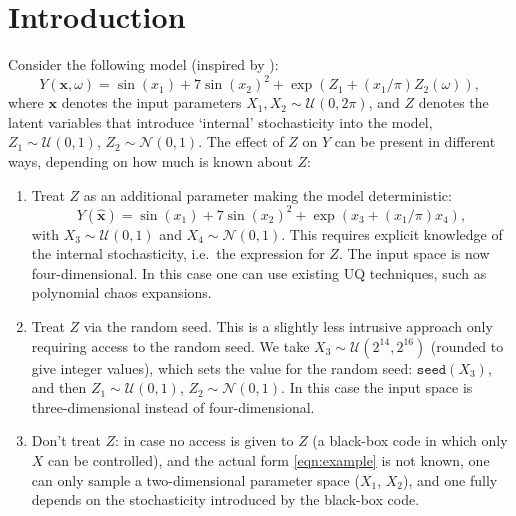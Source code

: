 \documentclass{elsarticle}
\newcommand{\vt}[1]{\bm{#1}}
\begin{document}
\section{Introduction}
Consider the following model (inspired by \cite{Zhu2020a}):
\begin{equation}\label{eqn:example}
Y(\vt{x},\omega) = \sin(x_{1}) + 7 \sin(x_{2})^2 + \exp( Z_{1} + (x_{1}/\pi) Z_{2}(\omega)),
\end{equation}
where $\vt{x}$ denotes the input parameters $X_{1},X_{2} \sim \mathcal{U}(0,2\pi)$, and $Z$ denotes the latent variables that introduce `internal' stochasticity into the model, $Z_{1} \sim \mathcal{U}(0,1)$, $Z_{2} \sim \mathcal{N}(0,1)$.
The effect of $Z$ on $Y$ can be present in different ways, depending on how much is known about $Z$:
\begin{enumerate}
\item Treat $Z$ as an additional parameter making the model deterministic:
\begin{equation}
Y(\hat{\vt{x}}) = \sin(x_{1}) + 7 \sin(x_{2})^2 + \exp( x_{3} + (x_{1}/\pi) x_{4}),
\end{equation}
with $X_{3}\sim \mathcal{U}(0,1)$ and $X_{4}\sim \mathcal{N}(0,1)$. This requires explicit knowledge of the internal stochasticity, i.e.\ the expression for $Z$. The input space is now four-dimensional. In this case one can use existing UQ techniques, such as polynomial chaos expansions.
\item Treat $Z$ via the random seed. This is a slightly less intrusive approach only requiring access to the random seed. We take $X_{3} \sim \mathcal{U}(2^{14}, 2^{16})$ (rounded to give integer values), which sets the value for the random seed: $\texttt{seed}(X_{3})$, and then $Z_{1} \sim \mathcal{U}(0,1)$, $Z_{2} \sim \mathcal{N}(0,1)$. In this case the input space is three-dimensional instead of four-dimensional.
\item Don't treat $Z$: in case no access is given to $Z$ (a black-box code in which only $X$ can be controlled), and the actual form \eqref{eqn:example} is not known, one can only sample a two-dimensional parameter space ($X_{1}$, $X_{2}$), and one fully depends on the stochasticity introduced by the black-box code.
\end{enumerate}
\end{document}
